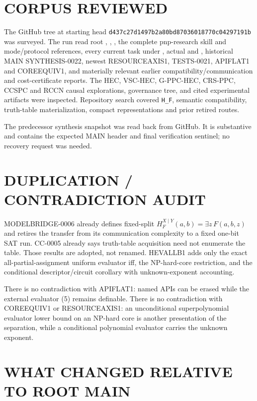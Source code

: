 \documentclass[11pt]{article}
\begin{document}
\section{CORPUS REVIEWED}

The GitHub tree at starting head
\texttt{d437c27d1497b2a80bd87036018770c04297191b} was surveyed.  The run read
root , , , the complete
pnp-research skill and mode/protocol references, every current task under
, actual  and , historical MAIN
SYNTHESIS-0022, newest RESOURCEAXIS1, TESTS-0021, APIFLAT1 and COREEQUIV1,
and materially relevant earlier compatibility/communication and cost-certificate
reports.  The HEC, VSC-HEC, G-PPC-HEC, CRS-PPC, CCSPC and RCCN causal
explorations, governance tree, and cited experimental artifacts were
inspected.  Repository search covered \texttt{H\_F}, semantic compatibility,
truth-table materialization, compact representations and prior retired routes.

The predecessor synthesis snapshot
 was read back
from GitHub.  It is substantive and contains the expected MAIN header and
final verification sentinel; no recovery request was needed.

\section{DUPLICATION / CONTRADICTION AUDIT}

MODELBRIDGE-0006 already defines fixed-split
$H_F^{X\mid Y}(a,b)=\exists z\,F(a,b,z)$ and retires the transfer from its
communication complexity to a fixed one-bit SAT run.  CC-0005 already says
truth-table acquisition need not enumerate the table.  Those results are
adopted, not renamed.  HEVALLB1 adds only the exact all-partial-assignment
uniform evaluator iff, the NP-hard-core restriction, and the conditional
descriptor/circuit corollary with unknown-exponent accounting.

There is no contradiction with APIFLAT1: named APIs can be erased while the
external evaluator (5) remains definable.  There is no contradiction with
COREEQUIV1 or RESOURCEAXIS1: an unconditional superpolynomial evaluator lower
bound on an NP-hard core is another presentation of the separation, while a
conditional polynomial evaluator carries the unknown exponent.

\section{WHAT CHANGED RELATIVE TO ROOT MAIN}
\end{document}
